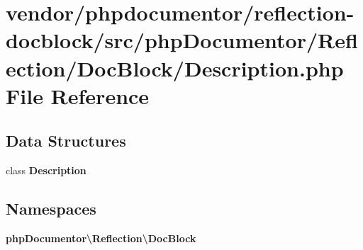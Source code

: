 \section{vendor/phpdocumentor/reflection-\/docblock/src/php\+Documentor/\+Reflection/\+Doc\+Block/\+Description.php File Reference}
\label{_description_8php}
\subsection*{Data Structures}
\begin{DoxyCompactItemize}
\item 
class {\bf Description}
\end{DoxyCompactItemize}
\subsection*{Namespaces}
\begin{DoxyCompactItemize}
\item 
 {\bf php\+Documentor\textbackslash{}\+Reflection\textbackslash{}\+Doc\+Block}
\end{DoxyCompactItemize}
